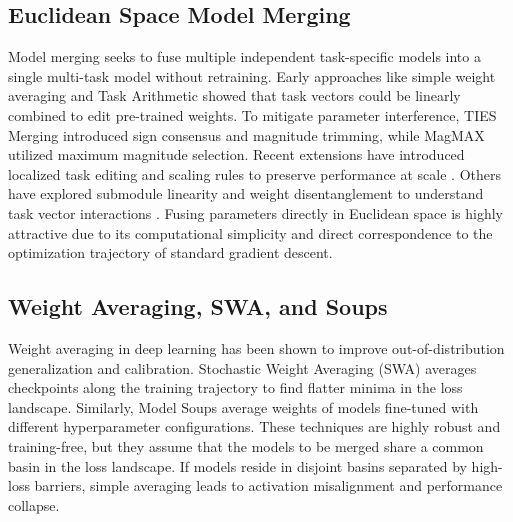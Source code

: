 \documentclass{article}
\begin{document}
\subsection{Euclidean Space Model Merging}
Model merging seeks to fuse multiple independent task-specific models into a single multi-task model without retraining. Early approaches like simple weight averaging \cite{wortsman2022model} and Task Arithmetic \cite{Ilharco2022EditingMW} showed that task vectors could be linearly combined to edit pre-trained weights. To mitigate parameter interference, TIES Merging \cite{Yadav2023TIESMergingRI} introduced sign consensus and magnitude trimming, while MagMAX \cite{marczak2024magmax} utilized maximum magnitude selection. Recent extensions have introduced localized task editing and scaling rules to preserve performance at scale \cite{Yadav2024WhatMF, He2024LocalizeandStitchEM, Sun2025TaskAI, Gargiulo2024TaskSV}. Others have explored submodule linearity and weight disentanglement to understand task vector interactions \cite{Dai2025LeveragingSL, Yoshida2025MasteringTA, Ortiz-Jiménez2023TaskAI, Singal2025TaskAF}. Fusing parameters directly in Euclidean space is highly attractive due to its computational simplicity and direct correspondence to the optimization trajectory of standard gradient descent.

\subsection{Weight Averaging, SWA, and Soups}
Weight averaging in deep learning has been shown to improve out-of-distribution generalization and calibration. Stochastic Weight Averaging (SWA) \cite{Guo2022StochasticWA, Cao2024DeepNN, Shin2020SQWASQ, Gu2023HierarchicalWA, Morales-Brotons2024ExponentialMA} averages checkpoints along the training trajectory to find flatter minima in the loss landscape. Similarly, Model Soups \cite{wortsman2022model, Seckler2022BayesianDL, Kaddour2022AFC, Madd_SWA_2019} average weights of models fine-tuned with different hyperparameter configurations. These techniques are highly robust and training-free, but they assume that the models to be merged share a common basin in the loss landscape. If models reside in disjoint basins separated by high-loss barriers, simple averaging leads to activation misalignment and performance collapse.
\end{document}
